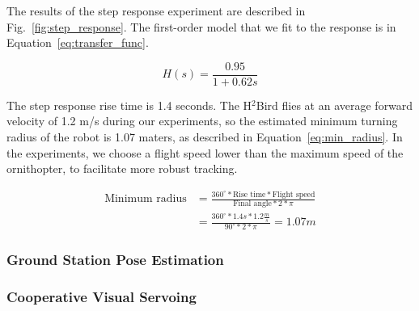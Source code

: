 \documentclass{aamas2013}
\begin{document}
The results of the step response experiment are described in
Fig.~\ref{fig:step_response}. The first-order model that we fit to the
response is in Equation~\ref{eq:transfer_func}.

\begin{equation}
\label{eq:transfer_func}
H(s) = \frac{0.95}{1+0.62s}
\end{equation}

The step response rise time is 1.4 seconds. The H$^2$Bird flies
at an average forward velocity of 1.2 m/s during our experiments, so the
estimated minimum turning radius of the robot is 1.07 maters, as described in
Equation~\ref{eq:min_radius}. In the experiments, we choose a flight speed
lower than the maximum speed of the ornithopter, to facilitate more robust
tracking.

\begin{equation}
\label{eq:min_radius}
\begin{aligned}
\text{Minimum radius} & = \frac{360^{\circ}*\text{Rise time}*\text{Flight speed}}{\text{Final angle}*2*\pi}\\
& = \frac{360^{\circ}*1.4s*1.2\frac{m}{s}}{90^{\circ}*2*\pi} = 1.07 m
\end{aligned}
\end{equation}

\subsubsection{Ground Station Pose Estimation}

\subsubsection{Cooperative Visual Servoing}
\label{sec:visual_servoing}
\end{document}
